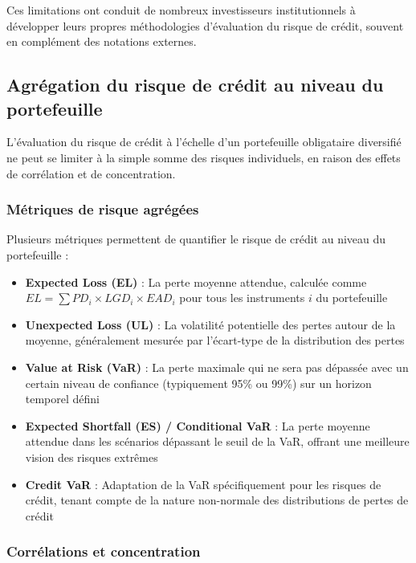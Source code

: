Ces limitations ont conduit de nombreux investisseurs institutionnels à développer leurs propres méthodologies d'évaluation du risque de crédit, souvent en complément des notations externes.

\subsection{Agrégation du risque de crédit au niveau du portefeuille}

L'évaluation du risque de crédit à l'échelle d'un portefeuille obligataire diversifié ne peut se limiter à la simple somme des risques individuels, en raison des effets de corrélation et de concentration.

\subsubsection{Métriques de risque agrégées}

Plusieurs métriques permettent de quantifier le risque de crédit au niveau du portefeuille :

\begin{itemize}
    \item \textbf{Expected Loss (EL)} : La perte moyenne attendue, calculée comme $EL = \sum PD_i \times LGD_i \times EAD_i$ pour tous les instruments $i$ du portefeuille
    
    \item \textbf{Unexpected Loss (UL)} : La volatilité potentielle des pertes autour de la moyenne, généralement mesurée par l'écart-type de la distribution des pertes
    
    \item \textbf{Value at Risk (VaR)} : La perte maximale qui ne sera pas dépassée avec un certain niveau de confiance (typiquement 95\% ou 99\%) sur un horizon temporel défini
    
    \item \textbf{Expected Shortfall (ES) / Conditional VaR} : La perte moyenne attendue dans les scénarios dépassant le seuil de la VaR, offrant une meilleure vision des risques extrêmes
    
    \item \textbf{Credit VaR} : Adaptation de la VaR spécifiquement pour les risques de crédit, tenant compte de la nature non-normale des distributions de pertes de crédit
\end{itemize}

\subsubsection{Corrélations et concentration}

